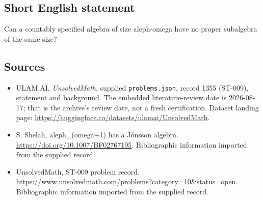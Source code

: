 \documentclass[11pt,a4paper]{article}
\begin{document}
\subsection{Short English statement}

Can a countably specified algebra of size aleph-omega have no proper subalgebra of the same size?

\subsection{Sources}

{\small

\begin{itemize}

\item[\hypertarget{source:1355:1}{S1}] ULAM.AI, \emph{UnsolvedMath}, supplied \texttt{problems.json}, record 1355 (ST-009), statement and background. The embedded literature-review date is 2026-08-17; that is the archive’s review date, not a fresh certification. Dataset landing page: \url{https://huggingface.co/datasets/ulamai/UnsolvedMath}.

\item[\hypertarget{source:1355:2}{S2}] S. Shelah, aleph\_(omega+1) has a Jónsson algebra. \url{https://doi.org/10.1007/BF02767195}. Bibliographic information imported from the supplied record.

\item[\hypertarget{source:1355:3}{S3}] UnsolvedMath, ST-009 problem record. \url{https://www.unsolvedmath.com/problems?category=10&status=open}. Bibliographic information imported from the supplied record.

\end{itemize}

}

\label{end:1355}
\end{document}
